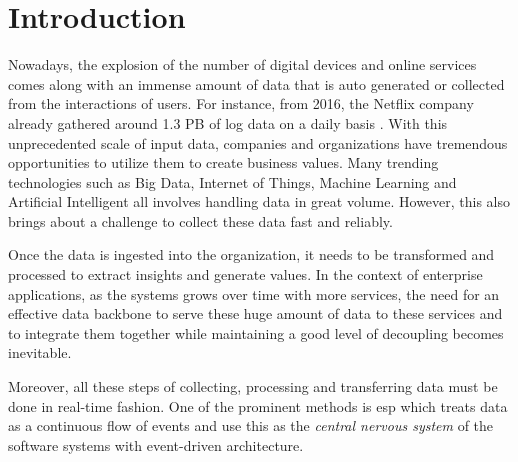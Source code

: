 \chapter{Introduction} \label{chap:intro}
Nowadays, the explosion of the number of digital devices and online services comes along with an immense amount of data that is auto generated or collected from the interactions of users. For instance, from 2016, the Netflix company already gathered around 1.3 PB of log data on a daily basis \cite{netflixpipeline}. With this unprecedented scale of input data, companies and organizations have tremendous opportunities to utilize them to create business values. Many trending technologies such as Big Data, Internet of Things, Machine Learning and Artificial Intelligent all involves handling data in great volume. However, this also brings about a challenge to collect these data fast and reliably.


Once the data is ingested into the organization, it needs to be transformed  and processed to extract insights and generate values. In the context of enterprise applications, as the systems grows over time with more services, the need for an effective data backbone to serve these huge amount of data to these services and to integrate them together while maintaining a good level of decoupling becomes inevitable.

Moreover, all these steps of collecting, processing and transferring data must be done in real-time fashion. One of the prominent methods is \acrfull{esp} which treats data as a continuous flow of events and use this as the \emph{central nervous system} of the software systems with event-driven architecture.


